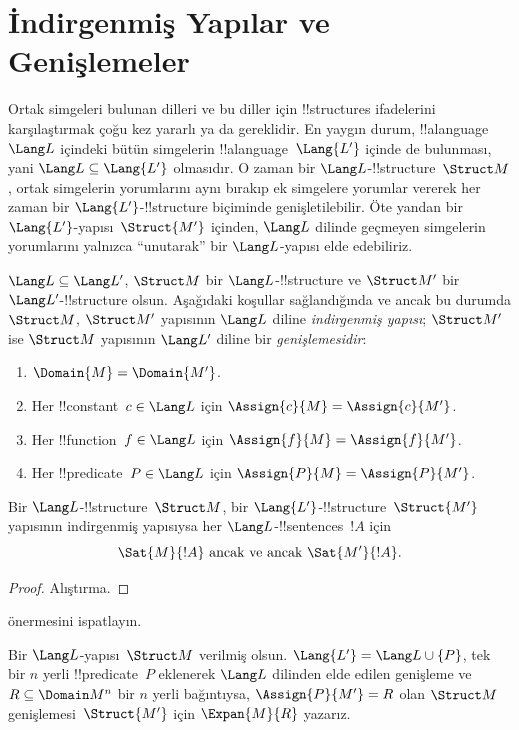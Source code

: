 

\section{İndirgenmiş Yapılar ve Genişlemeler}

Ortak simgeleri bulunan dilleri ve bu diller için !!{structure}s
ifadelerini karşılaştırmak çoğu kez yararlı ya da gereklidir. En yaygın
durum, !!a{language}~$\Lang L$ içindeki bütün simgelerin
!!a{language}~$\Lang{L'}$ içinde de bulunması, yani
$\Lang L\subseteq\Lang{L'}$ olmasıdır. O zaman bir
$\Lang L$-!!{structure}~$\Struct M$, ortak simgelerin yorumlarını aynı
bırakıp ek simgelere yorumlar vererek her zaman bir
$\Lang{L'}$-!!{structure} biçiminde genişletilebilir. Öte yandan bir
$\Lang{L'}$-yapısı~$\Struct{M'}$ içinden, $\Lang L$ dilinde geçmeyen
simgelerin yorumlarını yalnızca ``unutarak'' bir $\Lang L$-yapısı elde
edebiliriz.

\begin{defn}
$\Lang L\subseteq\Lang L'$, $\Struct M$ bir $\Lang L$-!!{structure}
ve $\Struct M'$ bir $\Lang L'$-!!{structure} olsun. Aşağıdaki koşullar
sağlandığında ve ancak bu durumda $\Struct M$, $\Struct M'$ yapısının
$\Lang L$ diline \emph{indirgenmiş yapısı}; $\Struct M'$ ise
$\Struct M$ yapısının $\Lang L'$ diline bir \emph{genişlemesidir}:
\begin{enumerate}
\item $\Domain{M}=\Domain{M'}$.
\item Her !!{constant}~$c\in\Lang L$ için
  $\Assign{c}{M}=\Assign{c}{M'}$.
\item Her !!{function}~$f\in\Lang L$ için
  $\Assign{f}{M}=\Assign{f}{M'}$.
\item Her !!{predicate}~$P\in\Lang L$ için
  $\Assign{P}{M}=\Assign{P}{M'}$.
\end{enumerate}
\end{defn}

\begin{prop}
Bir $\Lang L$-!!{structure}~$\Struct M$, bir
$\Lang{L'}$-!!{structure}~$\Struct{M'}$ yapısının indirgenmiş yapısıysa
her $\Lang L$-!!{sentence}s~$!A$ için
\[
\Sat{M}{!A} \text{ ancak ve ancak } \Sat{M'}{!A}.
\]
\end{prop}

\begin{proof}
  Alıştırma.
\end{proof}

\begin{prob}
 önermesini ispatlayın.
\end{prob}

\begin{defn}
Bir $\Lang L$-yapısı~$\Struct M$ verilmiş olsun. $\Lang{L'}=
\Lang L\cup\{P\}$, tek bir $n$ yerli !!{predicate}~$P$ eklenerek
$\Lang L$ dilinden elde edilen genişleme ve $R\subseteq\Domain M^n$
bir $n$ yerli bağıntıysa, $\Assign{P}{M'}=R$ olan $\Struct M$
genişlemesi~$\Struct{M'}$ için $\Expan{M}{R}$ yazarız.
\end{defn}

